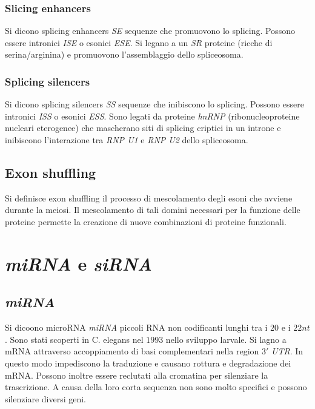 \subsubsection{Slicing enhancers}
Si dicono splicing enhancers \emph{SE} sequenze che promuovono lo splicing. Possono essere intronici \emph{ISE} o esonici \emph{ESE}. Si legano a un \emph{SR} proteine (ricche di 
serina/arginina) e promuovono l'assemblaggio dello spliceosoma. \subsubsection{Splicing silencers}
Si dicono splicing silencers \emph{SS} sequenze che inibiscono lo splicing. Possono essere intronici \emph{ISS} o esonici \emph{ESS}. Sono legati da proteine \emph{hnRNP} 
(ribonucleoproteine nucleari eterogenee) che mascherano siti di splicing criptici in un introne e inibiscono l'interazione tra \emph{RNP U1} e \emph{RNP U2} dello spliceosoma. 
\subsection{Exon shuffling}
Si definisce exon shuffling il processo di mescolamento degli esoni che avviene durante la meiosi. Il mescolamento di tali domini necessari per la funzione delle proteine permette
la creazione di nuove combinazioni di proteine funzionali. 
\section{\emph{miRNA} e \emph{siRNA}}
\subsection{\emph{miRNA}}
Si dicoono microRNA \emph{miRNA} piccoli RNA non codificanti lunghi tra i $20$ e i $22nt$. Sono stati scoperti in C. elegans nel $1993$ nello sviluppo larvale. Si lagno a mRNA attraverso
accoppiamento di basi complementari nella region $3'$ \emph{UTR}. In questo modo impediscono la traduzione e causano rottura e degradazione dei mRNA. Possono inoltre essere reclutati
alla cromatina per silenziare la trascrizione. A causa della loro corta sequenza non sono molto specifici e possono silenziare diversi geni. 
